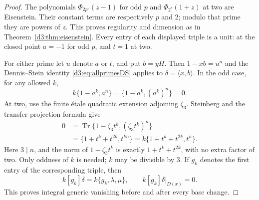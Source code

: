 \documentclass[11pt,a4paper]{amsart}
\numberwithin{equation}{section}
\theoremstyle{definition}
\theoremstyle{remark}
\begin{document}
\begin{proof}
The polynomials $\Phi_{2p^r}(z-1)$ for odd $p$ and
$\Phi_{2^r}(1+z)$ at two are Eisenstein.
Their constant terms are respectively $p$ and $2$; modulo that
prime they are powers of $z$. This proves regularity and dimension
as in Theorem~\ref{d3:thm:eisenstein}.
Every entry of each displayed triple is a unit: at the closed
point $a=-1$ for odd $p$, and $t=1$ at two.

For either prime let $u$ denote $a$ or $t$, and put $b=yH$.
Then $1-xb=u^n$ and the Dennis--Stein identity
\eqref{d3:eq:allprimesDS} applies to
$\delta=\langle x,b\rangle$.
In the odd case, for any allowed $k$,
\[
 k\{1-a^k,a^n\}=\{1-a^k,(a^k)^n\}=0.
\]
At two, use the finite \'etale quadratic extension adjoining
$\zeta_3$. Steinberg and the transfer projection formula give
\[
 \begin{split}
 0&=\operatorname{Tr}\{1-\zeta_3t^k,(\zeta_3t^k)^n\}\\
  &=\{1+t^k+t^{2k},t^{kn}\}
   =k\{1+t^k+t^{2k},t^n\}.
 \end{split}
\]
Here $3\mid n$, and the norm of $1-\zeta_3t^k$ is exactly
$1+t^k+t^{2k}$, with no extra factor of two.
Only oddness of $k$ is needed; $k$ may be divisible by $3$.
If $g_k$ denotes the first entry of the corresponding triple, then
\[
 k[g_k]\delta=k\{g_k,\lambda,\mu\},\qquad
 k[g_k]\delta|_{D(x)}=0.
\]
This proves integral generic vanishing before and after every base change.


\end{proof}
\end{document}
